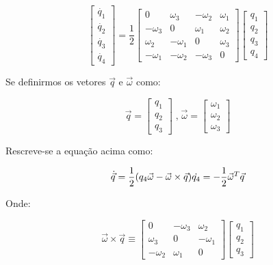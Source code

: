 \begin{equation}\begin{bmatrix}\dot{q_1} \\ \dot{q_2 }\\ \dot{q_3} \\\dot{q_4}\end{bmatrix}=\frac{1}{2}
\begin{bmatrix}
0&\omega_3&-\omega_2&\omega_ 1\\
-\omega_3&0&\omega_1&\omega_2 \\
\omega_2&-\omega_1&0&\omega_ 3\\
-\omega_1&-\omega_2&-\omega_3&0\end{bmatrix}
\begin{bmatrix}q_1 \\ q_2 \\ q_3 \\ q_4\end{bmatrix}\end{equation}

Se definirmos os vetores \begin{math}\vec{q}\end{math} e \begin{math}\vec{\omega}\end{math} como:

\begin{equation}\vec{q}=\begin{bmatrix}
q_1 \\ q_2 \\ q_3
\end{bmatrix}\;\text{,}\;\vec{\omega}=\begin{bmatrix}
\omega_1 \\ \omega_2 \\ \omega_3
\end{bmatrix}\end{equation}

Rescreve-se a equação acima como:

\begin{equation}\dot{\vec{q}}=\frac{1}{2}(q_4\vec{\omega}-\vec{\omega}\times \vec{q})\\
\dot{q_4}=-\frac{1}{2}\vec{\omega}^T\vec{q}\end{equation}

Onde:

\begin{equation}
\vec{\omega}\times\vec{q}\equiv\begin{bmatrix}
0&-\omega_3&\omega_2 \\\omega_3 &0&-\omega_1 \\ -\omega_2&\omega_1&0
\end{bmatrix}\begin{bmatrix}
q_1 \\ q_2 \\ q_3\end{bmatrix}
\end{equation}

